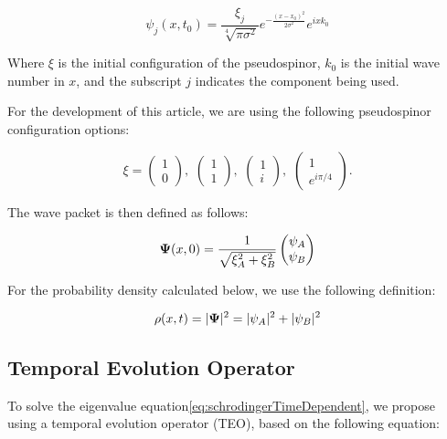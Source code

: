 \begin{equation}
    \label{eq:GWP}
    \psi_j(x,t_0)=\frac{\xi_j}{\sqrt[4]{\pi\sigma^2}}e^{-\frac{(x-x_0)^2}{2\sigma^2}}e^{ixk_0}
\end{equation}

\noindent Where $\xi$ is the initial configuration of the pseudospinor, $k_0$ is the initial wave number in $x$, and the subscript $j$ indicates the component being used.

For the development of this article, we are using the following pseudospinor configuration options:

\begin{equation}
    \label{eq:pseudospinorConfigurations}
    \xi=\begin{pmatrix}
            1\\0
    \end{pmatrix},\,\,\begin{pmatrix}
                          1\\1
    \end{pmatrix},\,\,\begin{pmatrix}
                          1\\i
    \end{pmatrix},\,\,\begin{pmatrix}
                          1\\e^{i\pi/4}
    \end{pmatrix}.
\end{equation}

The wave packet is then defined as follows:

\begin{equation}
    \label{eq:FinalGWP}
    \mbox{\boldmath $\Psi$}(x,0)=\frac{1}{\sqrt {\xi_A^2 + \xi_B^2}}\begin{pmatrix}
                                                          \psi_A\\\psi_B
    \end{pmatrix}
\end{equation}

For the probability density calculated below, we use the following definition:

\begin{equation}
    \label{eq:probDens}
    \rho(x,t)=|\mbox{\boldmath $\Psi$}|^2 = |\psi_A|^2+|\psi_B|^2
\end{equation}

\subsection{Temporal Evolution Operator}\label{subsec:temporal-evolution-operator}
To solve the eigenvalue equation\eqref{eq:schrodingerTimeDependent}, we propose using a temporal evolution operator (TEO), based on the following equation:

